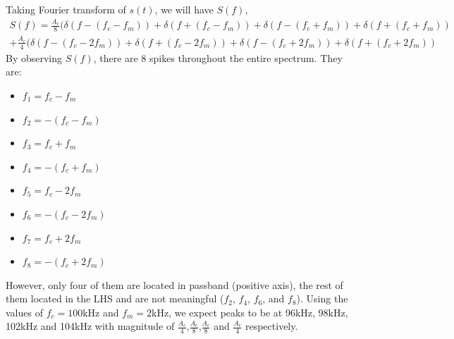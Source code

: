 \documentclass[11pt]{article}
\begin{document}
\begin{enumerate}[label=(\alph*)]
\begin{itemize}
\end{itemize}
Taking Fourier transform of $s(t)$, we will have $S(f)$,
     \begin{align*}
    S(f)= \frac{A_c}{8} (\delta (f-(f_c-f_m)) +\delta (f+(f_c-f_m)) +\delta (f-(f_c+f_m)) +\delta (f+(f_c+f_m))\\
    +\frac{A_c}{4} (\delta (f-(f_c-2f_m)) +\delta (f+(f_c-2f_m)) +\delta (f-(f_c+2f_m)) +\delta (f+(f_c+2f_m))
    \end{align*}
By observing $S(f)$, there are 8 spikes throughout the entire spectrum. They are: 
\begin{multicols}{2}
\begin{itemize}
    \item $f_1=f_c-f_m$
    \item $f_2=-(f_c-f_m)$
    \item $f_3=f_c+f_m$
    \item $f_4=-(f_c+f_m)$
    \item $f_5=f_c-2f_m$
    \item $f_6=-(f_c-2f_m)$
    \item $f_7=f_c+2f_m$
    \item $f_8=-(f_c+2f_m)$
\end{itemize}
\end{multicols}
However, only four of them are located in passband (positive axis), the rest of them located in the LHS and are not meaningful ($f_2$, $f_4$, $f_6$, and $f_8$). Using the values of $f_c = 100$kHz and $f_m = 2$kHz, we expect peaks to be at 96kHz, 98kHz, 102kHz and 104kHz with magnitude of $\frac{A_c}{4}$,$\frac{A_c}{8}$,$\frac{A_c}{8}$ and $\frac{A_c}{4}$ respectively.


\end{enumerate}
\end{document}
